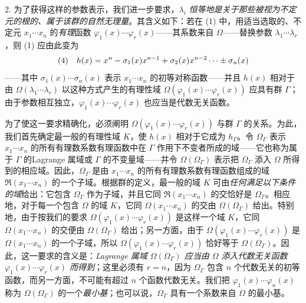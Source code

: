 2. 为了获得这样的参数表示，我们进一步要求，$\lambda_i$ \emph{恒等地是关于那些被视为不定元的根的、属于该群的自然无理量}。其含义如下：若在 (1) 中，用适当选取的、不定元 $x_1\cdots x_n$ 的\emph{有理}函数 $\varphi_1(x)\cdots\varphi_r(x)$——其系数来自 $\Omega$——替换参数 $\lambda_1\cdots\lambda_r$，则 (1) 应由此变为
\[
\begin{array}{@{}l@{\quad}l@{}}
(4)& \displaystyle h(x)=x^n-\sigma_1(x)x^{n-1}+\sigma_2(x)x^{n-2}\cdots\pm\sigma_n(x)
\end{array}
\]
——其中 $\sigma_1(x)\cdots\sigma_n(x)$ 表示 $x_1\cdots x_n$ 的初等对称函数——并且 $h(x)$ 相对于由 $\Omega(\lambda_1\cdots\lambda_r)$ 以这种方式产生的有理性域 $\Omega(\varphi_1(x)\cdots\varphi_r(x))$ 应具有群 $\Gamma$；由于参数相互独立，$\varphi_1(x)\cdots\varphi_r(x)$ 也应当是代数无关函数。

为了使这一要求精确化，必须阐明 $\Omega(\varphi_1(x)\cdots\varphi_r(x))$ 与群 $\Gamma$ 的关系。为此，我们首先确定最一般的有理性域 $K$，使 $h(x)$ 相对于它成为 $h_\Gamma$。令 $\Omega_\Gamma$ 表示 $x_1\cdots x_n$ 的所有有理数系数有理函数中在 $\Gamma$ 作用下不变者所成的域——它也称为属于 $\Gamma$ 的\glqq{}Lagrange 属域\grqq{}或 $\Gamma$ 的不变量域——并令 $\Omega(\Omega_\Gamma)$ 表示把 $\Omega_\Gamma$ 添入 $\Omega$ 所得到的相应域。因此，$\Omega_\Gamma$ 是由 $x_1\cdots x_n$ 的所有有理数系数有理函数组成的域 $\mathfrak R(x_1\cdots x_n)$ 的一个子域。根据群的定义，最一般的域 $K$ 可由\emph{任何满足以下条件的域}给出：它包含 $\Omega_\Gamma$ 作为子域，并且它同 $\mathfrak R(x_1\cdots x_n)$ 的交恰好是 $\Omega_\Gamma$。相应地，对于每一个包含 $\Omega$ 的域 $K$，它同 $\Omega(x_1\cdots x_n)$ 的交由 $\Omega(\Omega_\Gamma)$ 给出。特别地，由于按我们的要求 $\Omega(\varphi_1(x)\cdots\varphi_r(x))$ 是这样一个域 $K$，它同 $\Omega(x_1\cdots x_n)$ 的交便由 $\Omega(\Omega_\Gamma)$ 给出；另一方面，由于 $\Omega(\varphi_1(x)\cdots\varphi_r(x))$ 是 $\Omega(x_1\cdots x_n)$ 的一个子域，所以 $\Omega(\varphi_1(x)\cdots\varphi_r(x))$ 恰好等于 $\Omega(\Omega_\Gamma)$。因此，这一要求的含义是：\emph{Lagrange 属域 $\Omega(\Omega_\Gamma)$ 应当由 $\Omega$ 添入代数无关函数 $\varphi_1(x)\cdots\varphi_r(x)$ 而得到}；这里必须有 $r=n$，因为 $\Omega_\Gamma$ 包含 $n$ 个代数无关的初等函数，而另一方面，不可能有超过 $n$ 个函数代数无关。我们把 $\varphi_1(x)\cdots\varphi_n(x)$ 称为 $\Omega(\Omega_\Gamma)$ 的一个\emph{最小基}；也可以说，$\Omega_\Gamma$ 具有一个系数来自 $\Omega$ 的最小基。

